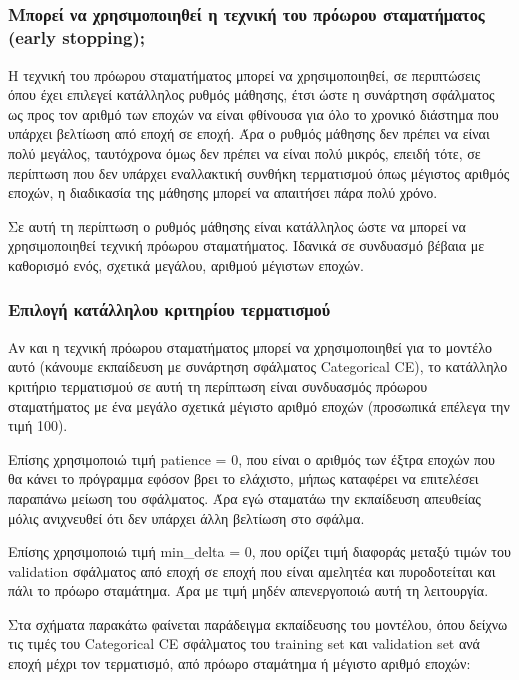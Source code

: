 \documentclass[12pt,a4paper]{article}
\begin{document}
\subsection{}

\subsubsection{Μπορεί να χρησιμοποιηθεί η τεχνική του πρόωρου σταματήματος (early stopping);}
Η τεχνική του πρόωρου σταματήματος μπορεί να χρησιμοποιηθεί, σε περιπτώσεις όπου έχει επιλεγεί κατάλληλος ρυθμός μάθησης, έτσι ώστε η συνάρτηση σφάλματος ως προς τον αριθμό των εποχών να είναι φθίνουσα για όλο το χρονικό διάστημα που υπάρχει βελτίωση από εποχή σε εποχή. Άρα ο ρυθμός μάθησης δεν πρέπει να είναι πολύ μεγάλος, ταυτόχρονα όμως δεν πρέπει να είναι πολύ μικρός, επειδή τότε, σε περίπτωση που δεν υπάρχει εναλλακτική συνθήκη τερματισμού όπως μέγιστος αριθμός εποχών, η διαδικασία της μάθησης μπορεί να απαιτήσει πάρα πολύ χρόνο.

Σε αυτή τη περίπτωση ο ρυθμός μάθησης είναι κατάλληλος ώστε να μπορεί να χρησιμοποιηθεί τεχνική πρόωρου σταματήματος. Ιδανικά σε συνδυασμό βέβαια με καθορισμό ενός, σχετικά μεγάλου, αριθμού μέγιστων εποχών.

\subsubsection{Επιλογή κατάλληλου κριτηρίου τερματισμού}
Αν και η τεχνική πρόωρου σταματήματος μπορεί να χρησιμοποιηθεί για το μοντέλο αυτό (κάνουμε εκπαίδευση με συνάρτηση σφάλματος Categorical CE), το κατάλληλο κριτήριο τερματισμού σε αυτή τη περίπτωση είναι συνδυασμός πρόωρου σταματήματος με ένα μεγάλο σχετικά μέγιστο αριθμό εποχών (προσωπικά επέλεγα την τιμή 100).

Επίσης χρησιμοποιώ τιμή patience = 0, που είναι ο αριθμός των έξτρα εποχών που θα κάνει το πρόγραμμα εφόσον βρει το ελάχιστο, μήπως καταφέρει να επιτελέσει παραπάνω μείωση του σφάλματος. Άρα εγώ σταματάω την εκπαίδευση απευθείας μόλις ανιχνευθεί ότι δεν υπάρχει άλλη βελτίωση στο σφάλμα.

Επίσης χρησιμοποιώ τιμή min\_delta = 0, που ορίζει τιμή διαφοράς μεταξύ τιμών του validation σφάλματος από εποχή σε εποχή που είναι αμελητέα και πυροδοτείται και πάλι το πρόωρο σταμάτημα. Άρα με τιμή μηδέν απενεργοποιώ αυτή τη λειτουργία.

Στα σχήματα παρακάτω φαίνεται παράδειγμα εκπαίδευσης του μοντέλου, όπου δείχνω τις τιμές του Categorical CE σφάλματος του training set και validation set ανά εποχή μέχρι τον τερματισμό, από πρόωρο σταμάτημα ή μέγιστο αριθμό εποχών:
\end{document}
